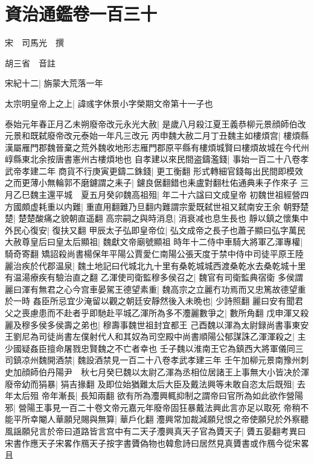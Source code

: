 \chapter{資治通鑑卷一百三十}
宋　司馬光　撰

胡三省　音註

宋紀十二|{
	旃蒙大荒落一年}


太宗明皇帝上之上|{
	諱彧字休景小字榮期文帝第十一子也}


泰始元年春正月乙未朔廢帝改元永光大赦|{
	是歲八月殺江夏王義恭柳元景顔師伯改元景和既弑廢帝改元泰始一年凡三改元}
丙申魏大赦二月丁丑魏主如樓煩宫|{
	樓煩縣漢屬雁門郡魏晉棄之荒外魏收地形志雁門郡原平縣有樓煩城賢曰樓煩故城在今代州崞縣東北余按唐書憲州古樓煩地也}
自孝建以來民間盗鑄濫錢|{
	事始一百二十八卷孝武帝孝建二年}
商貨不行庚寅更鑄二銖錢|{
	更工衡翻}
形式轉細官錢每出民間即模效之而更薄小無輪郭不磨鑢謂之耒子|{
	鑢良倨翻錯也耒盧對翻杜佑通典耒子作來子}
三月乙巳魏主還平城　夏五月癸卯魏高祖殂|{
	年二十六諡曰文成皇帝}
初魏世祖經營四方國頗虚耗重以内難|{
	重直用翻難乃旦翻内難謂宗愛既弑世祖又弑南安王余}
朝野楚楚|{
	楚楚酸痛之貌朝直遥翻}
高宗嗣之與時消息|{
	消衰减也息生長也}
靜以鎮之懷集中外民心復安|{
	復扶又翻}
甲辰太子弘即皇帝位|{
	弘文成帝之長子也蕭子顯曰弘字萬民}
大赦尊皇后曰皇太后顯祖|{
	魏獻文帝廟號顯祖}
時年十二侍中車騎大將軍乙渾專權|{
	騎奇寄翻}
矯詔殺尚書楊保年平陽公賈愛仁南陽公張天度于禁中侍中司徒平原王陸麗治疾於代郡温泉|{
	魏土地記曰代城北九十里有桑乾城城西渡桑乾水去桑乾城十里有温湯療疾有驗治直之翻}
乙渾使司衛監穆多侯召之|{
	魏官有司衛監典宿衛}
多侯謂麗曰渾有無君之心今宫車晏駕王德望素重|{
	魏高宗之立麗冇功焉而又忠篤故德望重於一時}
姦臣所忌宜少淹留以觀之朝廷安靜然後入未晩也|{
	少詩照翻}
麗曰安有聞君父之喪慮患而不赴者乎即馳赴平城乙渾所為多不灋麗數爭之|{
	數所角翻}
戊申渾又殺麗及穆多侯多侯壽之弟也|{
	穆壽事魏世祖封宜都王}
己酉魏以渾為太尉録尚書事東安王劉尼為司徒尚書左僕射代人和其奴為司空殿中尚書順陽公郁謀誅乙渾渾殺之|{
	主少國疑姦臣擅命屠戮忠賢魏之不亡者幸也}
壬子魏以淮南王它為鎮西大將軍儀同三司鎮凉州魏開酒禁|{
	魏設酒禁見一百二十八卷孝武孝建三年}
壬午加柳元景南豫州刺史加顔師伯丹陽尹　秋七月癸巳魏以太尉乙渾為丞相位居諸王上事無大小皆决於渾　廢帝幼而狷暴|{
	狷吉掾翻}
及即位始猶難太后大臣及戴法興等未敢自恣太后既殂|{
	去年太后殂}
帝年漸長|{
	長知兩翻}
欲有所為灋興輒抑制之謂帝曰官所為如此欲作營陽邪|{
	營陽王事見一百二十卷文帝元嘉元年廢帝固狂暴戴法興此言亦足以取死}
帝稍不能平所幸閹人華願兒賜與無算|{
	華戶化翻}
灋興常加裁減願兒恨之帝使願兒於外察聽風謡願兒言於帝曰道路皆言宫中有二天子灋興真天子官為贗天子|{
	贗五晏翻考異曰宋書作應天子宋畧作鴈天子按字書贗偽物也韓愈詩曰居然見真贗書或作鴈今從宋畧}
且

